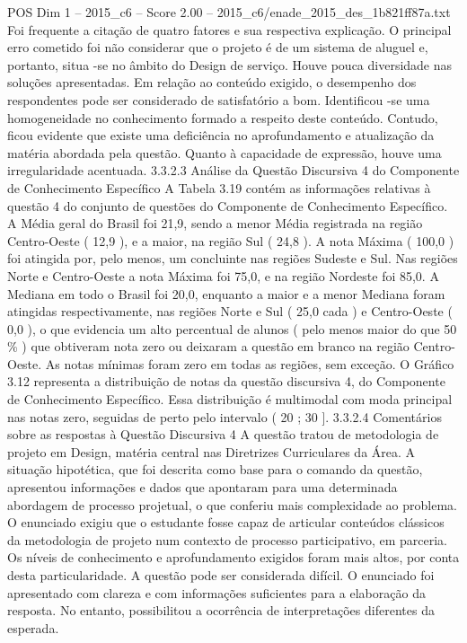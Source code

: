 \begin{textsample}{POS Dim 1 – 2015\_c6 – Score 2.00 – 2015\_c6/enade\_2015\_des\_1b821ff87a.txt}
Foi frequente a citação de quatro fatores e sua respectiva explicação.
O principal erro cometido foi não considerar que o projeto é de um sistema de aluguel e, portanto, situa -se no âmbito do Design de serviço.
Houve pouca diversidade nas soluções apresentadas.
Em relação ao conteúdo exigido, o desempenho dos respondentes pode ser considerado de satisfatório a bom.
Identificou -se uma homogeneidade no conhecimento formado a respeito deste conteúdo.
Contudo, ficou evidente que existe uma deficiência no aprofundamento e atualização da matéria abordada pela questão.
Quanto à capacidade de expressão, houve uma irregularidade acentuada. 3.3.2.3 Análise da Questão Discursiva 4 do Componente de Conhecimento Específico A Tabela 3.19 contém as informações relativas à questão 4 do conjunto de questões do Componente de Conhecimento Específico.
A Média geral do Brasil foi 21,9, sendo a menor Média registrada na região Centro-Oeste ( 12,9 ), e a maior, na região Sul ( 24,8 ).
A nota Máxima ( 100,0 ) foi atingida por, pelo menos, um concluinte nas regiões Sudeste e Sul.
Nas regiões Norte e Centro-Oeste a nota Máxima foi 75,0, e na região Nordeste foi 85,0.
A Mediana em todo o Brasil foi 20,0, enquanto a maior e a menor Mediana foram atingidas respectivamente, nas regiões Norte e Sul ( 25,0 cada ) e Centro-Oeste ( 0,0 ), o que evidencia um alto percentual de alunos ( pelo menos maior do que 50 \% ) que obtiveram nota zero ou deixaram a questão em branco na região Centro-Oeste.
As notas mínimas foram zero em todas as regiões, sem exceção.
O Gráfico 3.12 representa a distribuição de notas da questão discursiva 4, do Componente de Conhecimento Específico.
Essa distribuição é multimodal com moda principal nas notas zero, seguidas de perto pelo intervalo ( 20 ; 30 ]. 3.3.2.4 Comentários sobre as respostas à Questão Discursiva 4 A questão tratou de metodologia de projeto em Design, matéria central nas Diretrizes Curriculares da Área.
A situação hipotética, que foi descrita como base para o comando da questão, apresentou informações e dados que apontaram para uma determinada abordagem de processo projetual, o que conferiu mais complexidade ao problema.
O enunciado exigiu que o estudante fosse capaz de articular conteúdos clássicos da metodologia de projeto num contexto de processo participativo, em parceria.
Os níveis de conhecimento e aprofundamento exigidos foram mais altos, por conta desta particularidade.
A questão pode ser considerada difícil.
O enunciado foi apresentado com clareza e com informações suficientes para a elaboração da resposta.
No entanto, possibilitou a ocorrência de interpretações diferentes da esperada.

\end{textsample}
